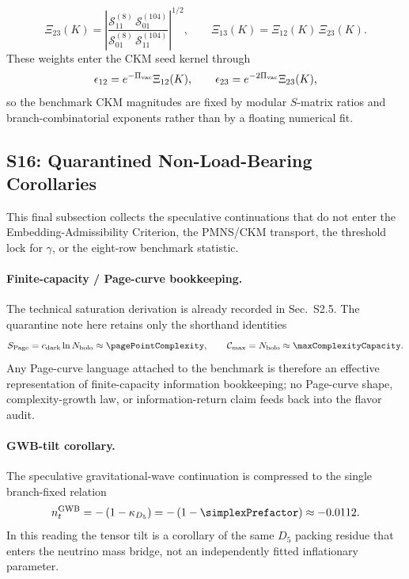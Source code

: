 \documentclass[11pt]{article}
\begin{document}
\begin{equation}
 \Xi_{23}(K)
 =
 \left|\frac{\mathcal S^{(8)}_{11}\,\mathcal S^{(104)}_{01}}{\mathcal S^{(8)}_{01}\,\mathcal S^{(104)}_{11}}\right|^{1/2},
 \qquad
 \Xi_{13}(K)=\Xi_{12}(K)\,\Xi_{23}(K).
\end{equation}
These weights enter the CKM seed kernel through
\begin{equation}
 \epsilon_{12}=e^{-\Pi_{\rm vac}}\Xi_{12}(K),
 \qquad
 \epsilon_{23}=e^{-2\Pi_{\rm vac}}\Xi_{23}(K),
\end{equation}
so the benchmark CKM magnitudes are fixed by modular $S$-matrix ratios and branch-combinatorial exponents rather than by a floating numerical fit.

\subsection*{S16: Quarantined Non-Load-Bearing Corollaries}

This final subsection collects the speculative continuations that do not enter the Embedding-Admissibility Criterion, the PMNS/CKM transport, the threshold lock for $\gamma$, or the eight-row benchmark statistic.

\paragraph{Finite-capacity / Page-curve bookkeeping.}
The technical saturation derivation is already recorded in Sec.~S2.5. The
quarantine note here retains only the shorthand identities
\begin{equation}
 S_{\rm Page}=c_{\rm dark}\ln N_{\rm holo}\approx\pagePointComplexity,
 \qquad
 \mathcal C_{\max}=N_{\rm holo}\approx\maxComplexityCapacity.
\end{equation}
Any Page-curve language attached to the benchmark is therefore an effective representation of finite-capacity information bookkeeping; no Page-curve shape, complexity-growth law, or information-return claim feeds back into the flavor audit.

\paragraph{GWB-tilt corollary.}
The speculative gravitational-wave continuation is compressed to the single branch-fixed relation
\begin{equation}
 n_t^{\rm GWB}
 =
 -\left(1-\kappa_{D_5}\right)
 =
 -\left(1-\simplexPrefactor\right)
 \approx -0.0112.
\end{equation}
In this reading the tensor tilt is a corollary of the same $D_5$ packing residue that enters the neutrino mass bridge, not an independently fitted inflationary parameter.
\end{document}

